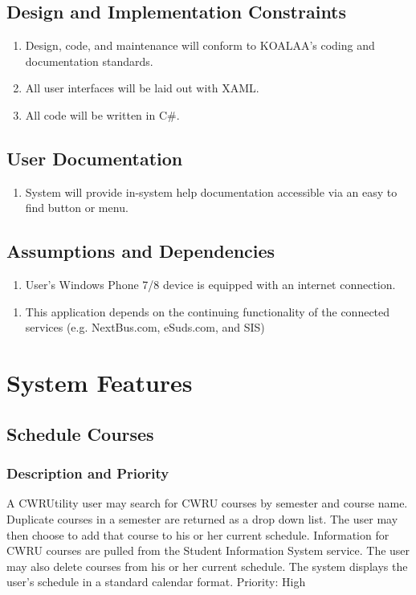 \documentclass[pdftex,12pt,letter]{article}
\begin{document}
\subsection{Design and Implementation Constraints}
\begin{enumerate}[CO-1:]
\item Design, code, and maintenance will conform to KOALAA's coding and documentation standards.
\item All user interfaces will be laid out with XAML.
\item All code will be written in C\#.
\end{enumerate}
\subsection{User Documentation}
\begin{enumerate}[UD-1:]
\item System will provide in-system help documentation accessible via an easy to find button or menu.
\end{enumerate}
\subsection{Assumptions and Dependencies}
\begin{enumerate}[{A}S-1:]
\item User's Windows Phone 7/8 device is equipped with an internet connection.
\end{enumerate}
\begin{enumerate}[DE-1:]
\item This application depends on the continuing functionality of the connected services (e.g. NextBus.com, eSuds.com, and SIS)
\end{enumerate}
\section{System Features}
\subsection{Schedule Courses}
\subsubsection{Description and Priority}
A CWRUtility user may search for CWRU courses by semester and course name. Duplicate courses in a semester are returned as a drop down list. The user may then choose to add that course to his or her current schedule. Information for CWRU courses are pulled from the Student Information System service. The user may also delete courses from his or her current schedule. The system displays the user's schedule in a standard calendar format. Priority: High
\end{document}

